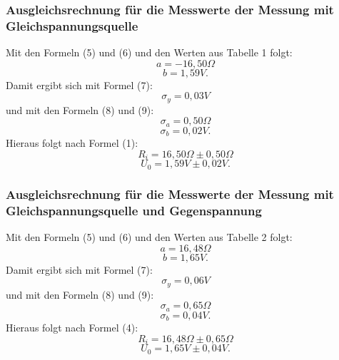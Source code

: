 \subsubsection{Ausgleichsrechnung für die Messwerte der Messung mit Gleichspannungsquelle}
Mit den Formeln (5) und (6) und den Werten aus Tabelle 1 folgt:
\begin{displaymath}
	a=-16,50\Omega
\end{displaymath}
\begin{displaymath}
	b=1,59V\text{.}
\end{displaymath}
Damit ergibt sich mit Formel (7):
\begin{displaymath}
	\sigma_y=0,03V
\end{displaymath}
und mit den Formeln (8) und (9):
\begin{displaymath}
	\sigma_a=0,50\Omega
\end{displaymath}
\begin{displaymath}
	\sigma_b=0,02V\text{.}
\end{displaymath}
Hieraus folgt nach Formel (1):
\begin{displaymath}
	R_i=16,50\Omega\pm 0,50\Omega
\end{displaymath}
\begin{displaymath}
	U_0=1,59V\pm 0,02V\text{.}
\end{displaymath}

\subsubsection{Ausgleichsrechnung für die Messwerte der Messung mit Gleichspannungsquelle und Gegenspannung}

Mit den Formeln (5) und (6) und den Werten aus Tabelle 2 folgt:
\begin{displaymath}
a=16,48\Omega
\end{displaymath}
\begin{displaymath}
b=1,65V\text{.}
\end{displaymath}
Damit ergibt sich mit Formel (7):
\begin{displaymath}
\sigma_y=0,06V
\end{displaymath}
und mit den Formeln (8) und (9):
\begin{displaymath}
\sigma_a=0,65\Omega
\end{displaymath}
\begin{displaymath}
\sigma_b=0,04V\text{.}
\end{displaymath}
Hieraus folgt nach Formel (4):
\begin{displaymath}
R_i=16,48\Omega\pm 0,65\Omega
\end{displaymath}
\begin{displaymath}
U_0=1,65V\pm 0,04V\text{.}
\end{displaymath}

